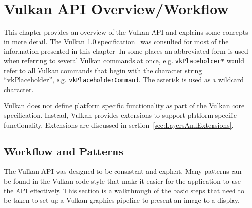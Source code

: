 
\chapter{Vulkan API Overview/Workflow}
\label{cha:VulkanOverview}

  This chapter provides an overview of the Vulkan API and explains some concepts in more detail. The Vulkan 1.0 specification~\cite{vkspec} was consulted for most of the information presented in this chapter. In some places an abbreviated form is used when referring to several Vulkan commands at once, e.g. \lstinline{vkPlaceholder*} would refer to all Vulkan commands that begin with the character string ``vkPlaceholder'', e.g. \lstinline{vkPlaceholderCommand}. The asterisk is used as a wildcard character.

  Vulkan does not define platform specific functionality as part of the Vulkan core specification. Instead, Vulkan provides extensions to support platform specific functionality. Extensions are discussed in section~\ref{sec:LayersAndExtensions}.

  \section{Workflow and Patterns}
  \label{sec:WorkflowAndPatterns}
    The Vulkan API was designed to be consistent and explicit. Many patterns can be found in the Vulkan code style that make it easier for the \gls{application} to use the API effectively. This section is a walkthrough of the basic steps that need to be taken to set up a Vulkan graphics pipeline to present an image to a display.


